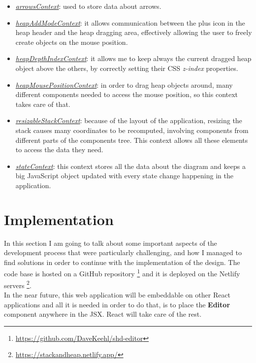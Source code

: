 \documentclass[]{usiinfbachelorproject}
\begin{document}
\begin{itemize}
	\item \ul{\emph{arrowsContext}}: used to store data about arrows.
	\item \ul{\emph{heapAddModeContext}}: it allows communication between the plus icon in the heap header and the heap dragging area, effectively allowing the user to freely create objects on the mouse position.
	\item \ul{\emph{heapDepthIndexContext}}: it allows me to keep always the current dragged heap object above the others, by correctly setting their CSS \emph{z-index} properties.
	\item \ul{\emph{heapMousePositionContext}}: in order to drag heap objects around, many different components needed to access the mouse position, so this context takes care of that.
	\item \ul{\emph{resizableStackContext}}: because of the layout of the application, resizing the stack causes many coordinates to be recomputed, involving components from different  parts of the components tree. This context allows all these elements to access the data they need.
	\item \ul{\emph{stateContext}}: this context stores all the data about the diagram and keeps a big JavaScript object updated with every state change happening in the application.
\end{itemize}

\vspace{\fill}

\pagebreak

\section{Implementation} \label{implementation}

In this section I am going to talk about some important aspects of the development process that were particularly challenging, and how I managed to find solutions in order to continue with the implementation of the design. The code base is hosted on a GitHub repository \footnote{\url{https://github.com/DaveKeehl/shd-editor}} and it is deployed on the Netlify servers \footnote{\url{https://stackandheap.netlify.app/}}.\\
\noindent In the near future, this web application will be embeddable on other React applications and all it is needed in order to do that, is to place the \textbf{Editor} component anywhere in the JSX. React will take care of the rest.
\end{document}
